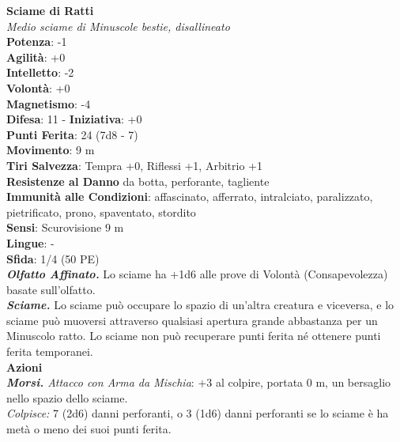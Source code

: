\begin{multicols}{2}
\medskip\textbf{Sciame di Ratti}\\
\emph{Medio sciame di Minuscole bestie, disallineato}\\
\textbf{Potenza}: -1\\
\textbf{Agilità}: +0\\
\textbf{Intelletto}: -2\\
\textbf{Volontà}: +0\\
\textbf{Magnetismo}: -4\\
\textbf{Difesa}: 11 - \textbf{Iniziativa}: +0\\
\textbf{Punti Ferita}: 24 (7d8 - 7)\\
\textbf{Movimento}: 9 m\\
\textbf{Tiri Salvezza}: Tempra +0, Riflessi +1, Arbitrio +1\\
\textbf{Resistenze al Danno} da botta, perforante, tagliente\\
\textbf{Immunità alle Condizioni}: affascinato, afferrato, intralciato, paralizzato, pietrificato, prono, spaventato, stordito\\
\textbf{Sensi}: Scurovisione 9 m\\
\textbf{Lingue}: -\\
\textbf{Sfida}: 1/4 (50 PE)\smallskip\\
\emph{\textbf{Olfatto Affinato.}} Lo sciame ha +1d6 alle prove di Volontà (Consapevolezza) basate sull'olfatto.\\
\emph{\textbf{Sciame.}} Lo sciame può occupare lo spazio di un'altra creatura e viceversa, e lo sciame può muoversi attraverso qualsiasi apertura grande abbastanza per un Minuscolo ratto. Lo sciame non può recuperare punti ferita né ottenere punti ferita temporanei.\\
\smallskip\textbf{Azioni}\\
\emph{\textbf{Morsi.} Attacco con Arma da Mischia}: +3 al colpire, portata 0 m, un bersaglio nello spazio dello sciame.\\
\emph{Colpisce:} 7 (2d6) danni perforanti, o 3 (1d6) danni perforanti se lo sciame è ha metà o meno dei suoi punti ferita.\\


\end{multicols}
